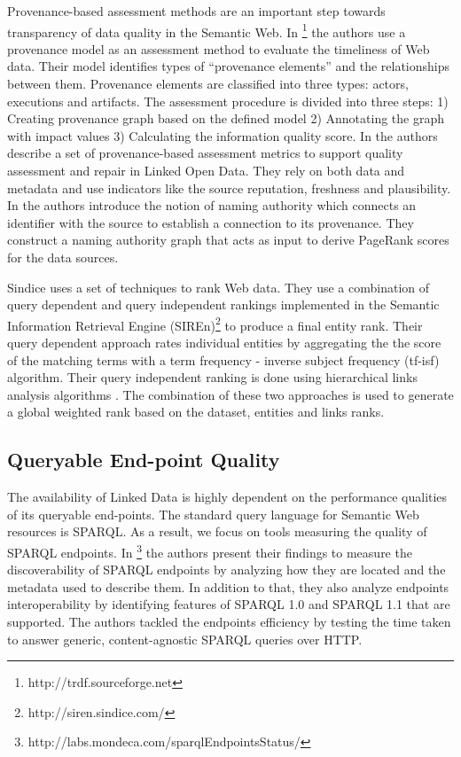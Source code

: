 \documentclass[onecolumn, crcready]{iosart2c}
\begin{document}

Provenance-based assessment methods are an important step towards transparency of data quality in the Semantic Web. In \cite{Hartig09usingweb}\footnote{http://trdf.sourceforge.net} the authors use a provenance model as an assessment method to evaluate the timeliness of Web data. Their model identifies types of ``provenance elements'' and the relationships between them. Provenance elements are classified into three types: actors, executions and artifacts. The assessment procedure is divided into three steps: 1) Creating provenance graph based on the defined model 2) Annotating the graph with impact values 3) Calculating the information quality score. In \cite{Flouris2012} the authors describe a set of provenance-based assessment metrics to support quality assessment and repair in Linked Open Data. They rely on both data and metadata and use indicators like the source reputation, freshness and plausibility. In \cite{Harth2009} the authors introduce the notion of naming authority which connects an identifier with the source to establish a connection to its provenance. They construct a naming authority graph that acts as input to derive PageRank scores for the data sources.\\


Sindice \cite{Delbru2010} uses a set of techniques to rank Web data. They use a combination of query dependent and query independent rankings implemented in the Semantic Information Retrieval Engine (SIREn)\footnote{http://siren.sindice.com/} to produce a final entity rank. Their query dependent approach rates individual entities by aggregating the the score of the matching terms with a term frequency - inverse subject frequency (tf-isf) algorithm. Their query independent ranking is done using hierarchical links analysis algorithms \cite{Delbru2010a}. The combination of these two approaches is used to generate a global weighted rank based on the dataset, entities and links ranks.\\

\subsection{Queryable End-point Quality}

The availability of Linked Data is highly dependent on the performance qualities of its queryable end-points. The standard query language for Semantic Web resources is SPARQL. As a result, we focus on tools measuring the quality of SPARQL endpoints. In \cite{Buil-Aranda2013}\footnote{http://labs.mondeca.com/sparqlEndpointsStatus/} the authors present their findings to measure the discoverability of SPARQL endpoints by analyzing how they are located and the metadata used to describe them. In addition to that, they also analyze endpoints interoperability by identifying features of SPARQL 1.0 and SPARQL 1.1 that are supported. The authors tackled the endpoints efficiency by testing the time taken to answer generic, content-agnostic SPARQL queries over HTTP.\\
\end{document}
